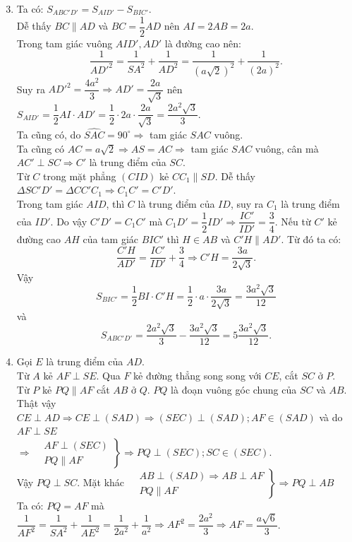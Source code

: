 \begin{bt}
{		\begin{enumerate}\setcounter{enumi}{2}
		\item Ta có: ${S}_{ABC'D'}={S}_{AID'} -{S}_{BIC'}$.\\
		Dễ thấy $BC\parallel AD$ và $BC=\dfrac{1}{2}AD$ nên $AI=2AB=2a$. \\
		Trong tam giác vuông $AID',AD'$ là đường cao nên:
		$$\dfrac{1}{AD'^2}=\dfrac{1}{SA^2}+\dfrac{1}{AD^2}=\dfrac{1}{{\left(a\sqrt{2}\right)}^2}+\dfrac{1}{(2a)^2}.$$
		Suy ra $AD'^2=\dfrac{4a^2}{3} \Rightarrow AD'=\dfrac{2a}{\sqrt{3}}$ nên $S_{AID'}=\dfrac{1}{2}AI\cdot AD'=\dfrac{1}{2}\cdot 2a\cdot \dfrac{2a}{\sqrt{3}}=\dfrac{2a^2\sqrt{3}}{3}$. \\
		Ta cũng có, do $\widehat{SAC}=90^{\circ} \Rightarrow $ tam giác $SAC$ vuông. \\
		Ta cũng có $AC=a\sqrt{2} \Rightarrow AS=AC \Rightarrow $ tam giác $SAC$ vuông, cân mà $AC'\perp SC \Rightarrow C'$ là trung điểm của $SC$. \\
		Từ $C$ trong mặt phẳng $(CID)$ kẻ $CC_1\parallel SD$. Dễ thấy $ \Delta SC'D'= \Delta CC'C_1 \Rightarrow C_1C'=C'D'$. \\
		Trong tam giác $AID$, thì $C$ là trung điểm của $ID$, suy ra $C_1$ là trung điểm của $ID'$. Do vậy $C'D'=C_1C'$ mà $C_1D'=\dfrac{1}{2}ID' \Rightarrow \dfrac{IC'}{ID'}=\dfrac{3}{4}$. Nếu từ $C'$ kẻ đường cao $AH$ của tam giác $BIC'$ thì $H\in AB$ và $C'H\parallel AD'$. Từ đó ta có:
		$$\dfrac{C'H}{AD'}=\dfrac{IC'}{ID'}+\dfrac{3}{4} \Rightarrow C'H=\dfrac{3a}{2\sqrt{3}}.$$
		Vậy $$S_{BIC'}=\dfrac{1}{2}BI\cdot C'H=\dfrac{1}{2}\cdot a\cdot \dfrac{3a}{2\sqrt{3}}=\dfrac{3a^2\sqrt{3}}{12}$$ và $$S_{ABC'D'}=\dfrac{2a^2\sqrt{3}}{3}-\dfrac{3a^2\sqrt{3}}{12}=5\dfrac{3a^2\sqrt{3}}{12}.$$
		\item Gọi $E$ là trung điểm của $AD$. \\
		Từ $A$ kẻ $AF\perp SE$. Qua $F$ kẻ đường thẳng song song với $CE$, cắt $SC$ ở $P$.\\
		Từ $P$ kẻ $PQ\parallel AF$ cắt $AB$ ở $Q$. $PQ$ là đoạn vuông góc chung của $SC$ và $AB$. \\
		Thật vậy $CE\perp AD \Rightarrow CE\perp (SAD) \Rightarrow (SEC)\perp (SAD);AF\in (SAD)$ và do $AF\perp SE$  \\
		$\Rightarrow \left.\begin{aligned}
		&AF\perp (SEC) \\
		&PQ\parallel AF
		\end{aligned}\right\} \Rightarrow PQ\perp (SEC);SC\in (SEC)$. \\
		Vậy $PQ\perp SC$. Mặt khác $\left.\begin{aligned}
		&AB\perp (SAD) \Rightarrow AB\perp AF \\
		&PQ\parallel AF
		\end{aligned}\right\} \Rightarrow PQ\perp AB$ \\
		Ta có: $PQ=AF$ mà $\dfrac{1}{AF^2}=\dfrac{1}{SA^2}+\dfrac{1}{AE^2}=\dfrac{1}{2a^2}+\dfrac{1}{a^2} \Rightarrow AF^2=\dfrac{2a^2}{3} \Rightarrow AF=\dfrac{a\sqrt{6}}{3}$.
	\end{enumerate} 
	}
\end{bt}

